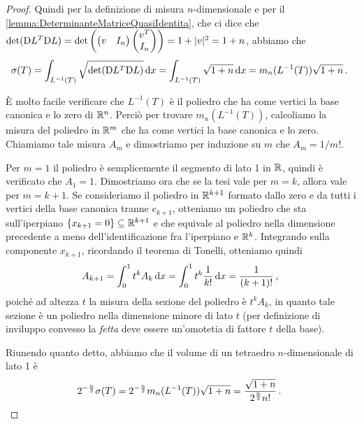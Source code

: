 \begin{proof}
	Quindi per la definizione di misura $n$-dimensionale e per il \cref{lemma:DeterminanteMatriceQuasiIdentita}, che ci dice che $\det(\mathrm D L^T\mathrm D L)=\det\left(\begin{pmatrix}v& I_n\end{pmatrix}\begin{pmatrix}v^T\\I_n\end{pmatrix}\right)=1+\lvert v\rvert^2=1+n$, abbiamo che
	\begin{equation*}
		\sigma(T)=\int_{L^{-1}(T)}\sqrt{\det(\mathrm D L^T\mathrm D L)}\,\mathrm d x= \int_{L^{-1}(T)}\sqrt{1+n}\,\mathrm d x=m_n(L^{-1}(T))\sqrt{1+n}\, \text{. }
	\end{equation*}

	È molto facile verificare che $L^{-1}(T)$ è il poliedro che ha come vertici la base canonica e lo zero di $\mathbb R^n$. Perciò per trovare $m_n(L^{-1}(T))$, calcoliamo la misura del poliedro in $\mathbb R^m$ che ha come vertici la base canonica e lo zero. Chiamiamo tale misura $A_m$ e dimostriamo per induzione su $m$ che $A_m=1/m!$.
	
	Per $m=1$ il poliedro è semplicemente il segmento di lato 1 in $\mathbb R$, quindi è verificato che $A_1=1$. Dimostriamo ora che se la tesi vale per $m=k$, allora vale per $m=k+1$. Se consideriamo il poliedro in $\mathbb R^{k+1}$ formato dallo zero e da tutti i vertici della base canonica tranne $e_{k+1}$, otteniamo un poliedro che sta sull'iperpiano $\{x_{k+1}=0\}\subseteq\mathbb R^{k+1}$ e che equivale al poliedro nella dimensione precedente a meno dell'identificazione fra l'iperpiano e $\mathbb R^k$. 
	Integrando sulla componente $x_{k+1}$, ricordando il teorema di Tonelli, otteniamo quindi
	\begin{equation*}
		A_{k+1}=\int_0^1t^kA_k\,\mathrm d x=\int_0^1t^k\frac 1{k!}\,\mathrm d x=\frac 1{(k+1)!}\, \text{, }
	\end{equation*}
	poiché ad altezza $t$ la misura della sezione del poliedro è $t^kA_k$, in quanto tale sezione è un poliedro nella dimensione minore di lato $t$ (per definizione di inviluppo convesso la \emph{fetta} deve essere un'omotetia di fattore $t$ della base).
	
	Riunendo quanto detto, abbiamo che il volume di un tetraedro $n$-dimensionale di lato 1 è
	\begin{equation*}
		2^{-\frac n2}\sigma(T)=2^{-\frac n2}m_n(L^{-1}(T))\sqrt{1+n}=\frac{\sqrt{1+n}}{2^{\frac n2}n!}\, \text{. }		
	\end{equation*}
		
\end{proof}

